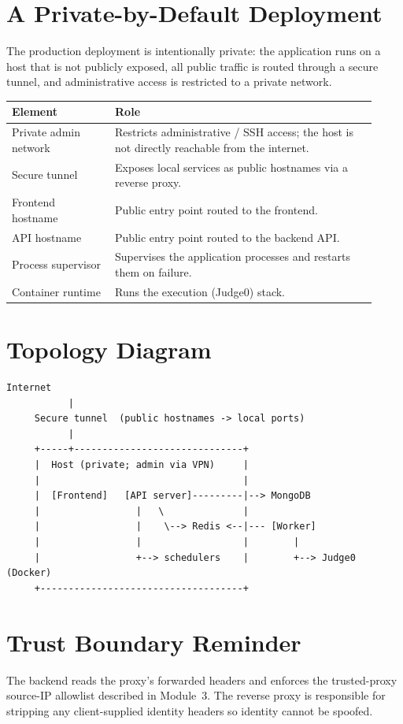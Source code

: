 \documentclass[12pt,a4paper,oneside]{report}
\begin{document}
\section{A Private-by-Default Deployment}
The production deployment is intentionally private: the application runs on a host
that is not publicly exposed, all public traffic is routed through a secure tunnel,
and administrative access is restricted to a private network.
\begin{longtable}{@{}p{0.26\linewidth} p{0.66\linewidth}@{}}
\toprule
\textbf{Element} & \textbf{Role}\\
\midrule
\endhead
Private admin network & Restricts administrative / SSH access; the host is not directly reachable from the internet.\\
Secure tunnel & Exposes local services as public hostnames via a reverse proxy.\\
Frontend hostname & Public entry point routed to the frontend.\\
API hostname & Public entry point routed to the backend API.\\
Process supervisor & Supervises the application processes and restarts them on failure.\\
Container runtime & Runs the execution (Judge0) stack.\\
\bottomrule
\end{longtable}

\section{Topology Diagram}
\begin{lstlisting}[language={}]
        Internet
           |
     Secure tunnel  (public hostnames -> local ports)
           |
     +-----+------------------------------+
     |  Host (private; admin via VPN)     |
     |                                    |
     |  [Frontend]   [API server]---------|--> MongoDB
     |                 |   \              |
     |                 |    \--> Redis <--|--- [Worker]
     |                 |                  |        |
     |                 +--> schedulers    |        +--> Judge0 (Docker)
     +------------------------------------+
\end{lstlisting}

\section{Trust Boundary Reminder}
The backend reads the proxy's forwarded headers and enforces the trusted-proxy
source-IP allowlist described in Module~3. The reverse proxy is responsible for
stripping any client-supplied identity headers so identity cannot be spoofed.
\end{document}
